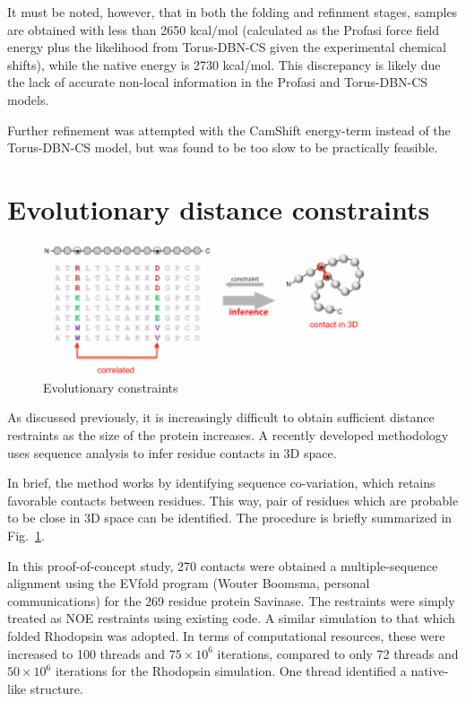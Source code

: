 It must be noted, however, that in both the folding and refinment stages, samples are obtained with less than 2650 kcal/mol (calculated as the Profasi force field energy plus the likelihood from Torus-DBN-CS given the experimental chemical shifts), while the native energy is 2730 kcal/mol.
This discrepancy is likely due the lack of accurate non-local information in the Profasi and Torus-DBN-CS models.

Further refinement was attempted with the CamShift energy-term instead of the Torus-DBN-CS model, but was found to be too slow to be practically feasible.





\section{Evolutionary distance constraints}

\begin{figure}
    \centering
    \includegraphics[width=0.85\textwidth]{figures/evo_constraint.pdf}
    \caption{Evolutionary constraints}
    \label{fig:evo_constraint}
\end{figure}

As discussed previously, it is increasingly difficult to obtain sufficient distance restraints as the size of the protein increases.
A recently developed methodology uses sequence analysis to infer residue contacts in 3D space. 

In brief, the method works by identifying sequence co-variation, which retains favorable contacts between residues.
This way, pair of residues which are probable to be close in 3D space can be identified.
The procedure is briefly summarized in Fig.~\ref{fig:evo_constraint}.

In this proof-of-concept study, 270 contacts were obtained a multiple-sequence alignment using the EVfold program (Wouter Boomsma, personal communications) for the 269 residue protein Savinase.
The restraints were simply treated as NOE restraints using existing code.
A similar simulation to that which folded Rhodopsin was adopted. 
In terms of computational resources, these were increased to 100 threads and $75 \times 10^6$ iterations, compared to only 72 threads and $50 \times 10^6$ iterations for the Rhodopsin simulation.
One thread identified a native-like structure.

